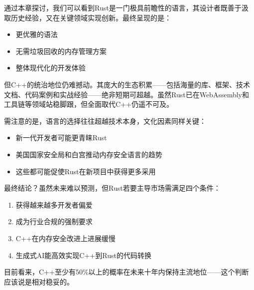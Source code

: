 通过本章探讨，我们可以看到Rust是一门极具前瞻性的语言，其设计者既善于汲取历史经验，又在关键领域实现创新。最终呈现的是：

\begin{itemize}
\item 
更优雅的语法

\item 
无需垃圾回收的内存管理方案

\item 
整体现代化的开发体验
\end{itemize}

但C++的统治地位仍难撼动。其庞大的生态积累——包括海量的库、框架、技术文档、代码案例和实战经验——绝非短期可超越。虽然Rust已在WebAssembly和工具链等领域站稳脚跟，但全面取代C++仍遥不可及。

需注意的是，语言的选择往往超越技术本身，文化因素同样关键：

\begin{itemize}
\item 
新一代开发者可能更青睐Rust

\item 
美国国家安全局和白宫推动内存安全语言的趋势

\item 
这些都可能促使Rust在新项目中获得更多采用
\end{itemize}

最终结论？虽然未来难以预测，但Rust若要主导市场需满足四个条件：

\begin{enumerate}
\item 
获得越来越多开发者偏爱

\item 
成为行业合规的强制要求

\item 
C++在内存安全改进上进展缓慢

\item 
生成式AI能高效实现C++到Rust的代码转换
\end{enumerate}

目前看来，C++至少有50\%以上的概率在未来十年内保持主流地位——这个判断应该说是相对稳妥的。
